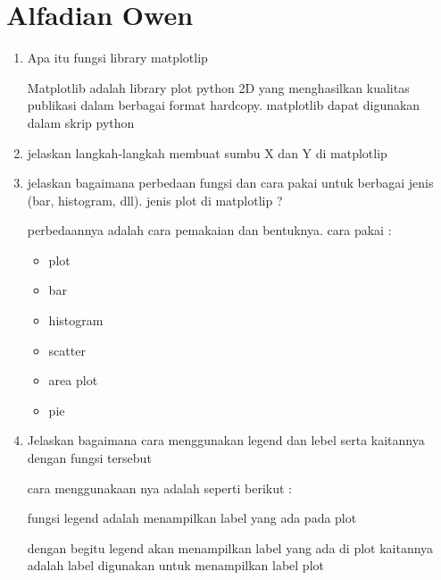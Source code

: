 \section{Alfadian Owen}
\begin{enumerate}
\item Apa itu fungsi library matplotlip 

Matplotlib adalah library plot python 2D yang menghasilkan kualitas publikasi dalam berbagai format hardcopy. matplotlib dapat digunakan dalam skrip python

\item jelaskan langkah-langkah membuat sumbu X dan Y di matplotlip



\item jelaskan bagaimana perbedaan fungsi dan cara pakai untuk berbagai jenis (bar, histogram, dll). jenis plot di matplotlip ?  

perbedaannya adalah cara pemakaian dan bentuknya.
cara pakai :
\begin{itemize}
    \item plot
    
    \item bar
    
    \item histogram
    
    \item scatter
    
    \item area plot
    
    \item pie
     
\end{itemize} 

\item Jelaskan bagaimana cara menggunakan legend dan lebel serta kaitannya dengan fungsi tersebut 

cara menggunakaan nya adalah seperti berikut :

fungsi legend adalah menampilkan label yang ada pada plot

dengan begitu legend akan menampilkan label yang ada di plot
kaitannya adalah label digunakan untuk menampilkan label plot


\end{enumerate}
